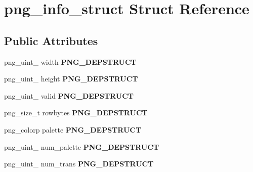 \hypertarget{structpng__info__struct}{}\section{png\+\_\+info\+\_\+struct Struct Reference}
\label{structpng__info__struct}
\subsection*{Public Attributes}
\begin{DoxyCompactItemize}
\item 
png\+\_\+uint\+\_ width {\bfseries P\+N\+G\+\_\+\+D\+E\+P\+S\+T\+R\+U\+CT}\hypertarget{structpng__info__struct_afd41442e38e3b7c16fb90c8ccb0e9932}{}\label{structpng__info__struct_afd41442e38e3b7c16fb90c8ccb0e9932}

\item 
png\+\_\+uint\+\_ height {\bfseries P\+N\+G\+\_\+\+D\+E\+P\+S\+T\+R\+U\+CT}\hypertarget{structpng__info__struct_a6bf677df6676b68ebafce3b19ffe08e6}{}\label{structpng__info__struct_a6bf677df6676b68ebafce3b19ffe08e6}

\item 
png\+\_\+uint\+\_ valid {\bfseries P\+N\+G\+\_\+\+D\+E\+P\+S\+T\+R\+U\+CT}\hypertarget{structpng__info__struct_a14fc657ec4389632c88ed7e0280af81f}{}\label{structpng__info__struct_a14fc657ec4389632c88ed7e0280af81f}

\item 
png\+\_\+size\+\_\+t rowbytes {\bfseries P\+N\+G\+\_\+\+D\+E\+P\+S\+T\+R\+U\+CT}\hypertarget{structpng__info__struct_a9a1b7d4e622897337a9e217c715ae4d8}{}\label{structpng__info__struct_a9a1b7d4e622897337a9e217c715ae4d8}

\item 
png\+\_\+colorp palette {\bfseries P\+N\+G\+\_\+\+D\+E\+P\+S\+T\+R\+U\+CT}\hypertarget{structpng__info__struct_a1eef1eefe7dd5232055338d41f5909d2}{}\label{structpng__info__struct_a1eef1eefe7dd5232055338d41f5909d2}

\item 
png\+\_\+uint\+\_ num\+\_\+palette {\bfseries P\+N\+G\+\_\+\+D\+E\+P\+S\+T\+R\+U\+CT}\hypertarget{structpng__info__struct_a04f0345dc93ae461918f1897c11acbcc}{}\label{structpng__info__struct_a04f0345dc93ae461918f1897c11acbcc}

\item 
png\+\_\+uint\+\_ num\+\_\+trans {\bfseries P\+N\+G\+\_\+\+D\+E\+P\+S\+T\+R\+U\+CT}\hypertarget{structpng__info__struct_a71d3599762687b720012d9cd7055d663}{}\label{structpng__info__struct_a71d3599762687b720012d9cd7055d663}


\end{DoxyCompactItemize}
